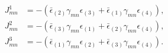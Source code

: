 \begin{equation}
\begin{aligned}
   J^1_{mn} &=  - \left( \bar\epsilon_{(2)}\gamma_{mn}\epsilon_{(3)}
      + \bar\epsilon_{(1)}\gamma_{mn}\epsilon_{(4)} \right) , \\
   J^2_{mn} &= -\left(\bar\epsilon_{(3)}\gamma_{mn}\epsilon_{(1)}
      + \bar\epsilon_{(2)}\gamma_{mn}\epsilon_{(4)} \right) , \\
   J^3_{mn} &= - \left(\bar\epsilon_{(1)}\gamma_{mn}\epsilon_{(2)}
      + \bar\epsilon_{(3)}\gamma_{mn}\epsilon_{(4)} \right) . 
\end{aligned}
\end{equation}

